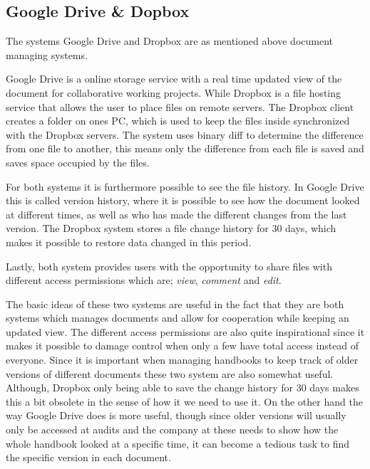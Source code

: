 \subsection{Google Drive \& Dopbox}
The systems Google Drive and Dropbox are as mentioned above document managing systems.

Google Drive is a online storage service with a real time updated view of the document for collaborative working projects.
While Dropbox is a file hosting service that allows the user to place files on remote servers.
The Dropbox client creates a folder on ones PC, which is used to keep the files inside synchronized with the Dropbox servers. 
The system uses binary diff to determine the difference from one file to another, this means only the difference from each file is saved and saves space occupied by the files\cite{DropboxDiff}.

For both systems it is furthermore possible to see the file history.
In Google Drive this is called version history, where it is possible to see how the document looked at different times, as well as who has made the different changes from the last version.
The Dropbox system stores a file change history for 30 days, which makes it possible to restore data changed in this period.

Lastly, both system provides users with the opportunity to share files with different access permissions which are; \textit{view}, \textit{comment} and \textit{edit}.

The basic ideas of these two systems are useful in the fact that they are both systems which manages documents and allow for cooperation while keeping an updated view.
The different access permissions are also quite inspirational since it makes it possible to damage control when only a few have total access instead of everyone.
Since it is important when managing handbooks to keep track of older versions of different documents these two system are also somewhat useful.
Although, Dropbox only being able to save the change history for 30 days makes this a bit obsolete in the sense of how it  we need to use it.
On the other hand the way Google Drive does is more useful, though since older versions will usually only be accessed at audits and the company at these needs to show how the whole handbook looked at a specific time, it can become a tedious task to find the specific version in each document.

